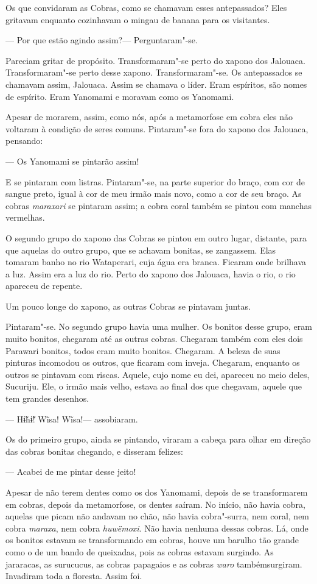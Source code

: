 Os que convidaram as Cobras, como se chamavam esses antepassados? Eles
gritavam enquanto cozinhavam o mingau de banana para os visitantes. 

--- Por que estão agindo assim?--- Perguntaram"-se.

Pareciam gritar de propósito. Transformaram"-se perto do xapono dos
Jalouaca. Transformaram"-se perto desse xapono. Transformaram"-se. Os
antepassados se chamavam assim, Jalouaca. Assim se chamava o líder. Eram
espíritos, são nomes de espírito. Eram Yanomami e moravam como os
Yanomami. 

Apesar de morarem, assim, como nós, após a metamorfose em cobra eles não
voltaram à condição de seres comuns. Pintaram"-se fora do xapono dos
Jalouaca, pensando: 

--- Os Yanomami se pintarão assim! 

E se pintaram com listras. Pintaram"-se, na parte superior do braço, com
cor de sangue preto, igual à cor de meu irmão mais novo, como a cor de
seu braço. As cobras \emph{maraxari} se pintaram assim; a cobra coral
também se pintou com manchas vermelhas. 

O segundo grupo do xapono das Cobras se pintou em outro lugar, distante,
para que aquelas do outro grupo, que se achavam bonitas, se zangassem.
Elas tomaram banho no rio Wataperari, cuja água era branca. Ficaram onde
brilhava a luz. Assim era a luz do rio. Perto do xapono dos Jalouaca,
havia o rio, o rio apareceu de repente. 

Um pouco longe do xapono, as outras Cobras se pintavam juntas. 

Pintaram"-se. No segundo grupo havia uma mulher. Os bonitos desse
grupo, eram muito bonitos, chegaram até as outras cobras. Chegaram
também com eles dois Parawari bonitos, todos eram muito bonitos.
Chegaram. A beleza de suas pinturas incomodou os outros, que ficaram com
inveja. Chegaram, enquanto os outros se pintavam com riscas. Aquele,
cujo nome eu dei, apareceu no meio deles, Sucuriju. Ele, o irmão mais
velho, estava ao final dos que chegavam, aquele que tem grandes
desenhos.

--- Hɨ̃hɨ̃! Wĩsa! Wĩsa!--- assobiaram. 

Os do primeiro grupo, ainda se pintando, viraram a cabeça para olhar em
direção das cobras bonitas chegando, e disseram felizes:

--- Acabei de me pintar desse jeito! 

Apesar de não terem dentes como os dos Yanomami, depois de se
transformarem em cobras, depois da metamorfose, os dentes saíram. No
início, não havia cobra, aquelas que picam não andavam no chão, não
havia cobra"-surra, nem coral, nem cobra \emph{maraxa}, nem
cobra \emph{huwëmoxi}. Não havia nenhuma dessas cobras. Lá, onde os
bonitos estavam se transformando em cobras, houve um barulho tão grande
como o de um bando de queixadas, pois as cobras estavam surgindo. As
jararacas, as surucucus, as cobras papagaios e as
cobras \emph{waro} tambémsurgiram. Invadiram toda a floresta. Assim foi. 

